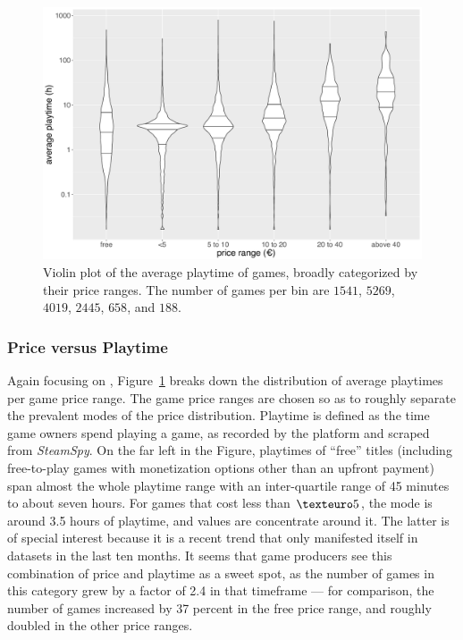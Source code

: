 

\begin{figure}[!t]
	\centering
	\includegraphics[width=1.0\columnwidth]{images/steam-cost-vs-playtime-non-sale.pdf}
	\caption{Violin plot of the average playtime of \steam games, broadly categorized by their price ranges. The number of games per bin are $1541$, $5269$, $4019$, $2445$, $658$, and $188$.}
\label{fig:steam-cost-vs-playtime-violin}
\end{figure}

\subsubsection{Price versus Playtime}
Again focusing on \steam,
Figure~\ref{fig:steam-cost-vs-playtime-violin} breaks down the
distribution of average playtimes per game price range. The game price
ranges are chosen so as to roughly separate the prevalent modes of the
price distribution.
Playtime is defined as the time game owners spend playing a game, as
recorded by the \steam platform and scraped from \textit{SteamSpy}.
On the far left in the Figure, playtimes of ``free'' titles
(including free-to-play games with monetization options other than an
upfront payment) span almost the whole playtime range with an
inter-quartile range of 45 minutes to about seven hours.
For games that cost less than $\texteuro 5$, the mode is around
3.5 hours of playtime, and values are concentrate around it. The
latter is of special interest because it is a recent trend that only
manifested itself in datasets in the last ten months. It seems that
game producers see this combination of price and playtime as a sweet
spot, as the number of games in this category grew by a factor of
2.4 in that timeframe --- for comparison, the number of games
increased by 37 percent in the free price range, and roughly doubled
in the other price ranges.

